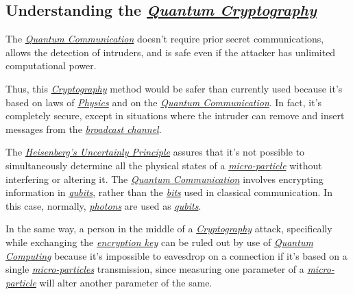 \documentclass[conference]{IEEEtran}
\begin{document}
\vspace{6pt}

\subsection{Understanding the \href{https://en.wikipedia.org/wiki/Quantum_cryptography}{\textit{Quantum Cryptography}}}\label{A4}

The \href{https://en.wikipedia.org/wiki/Quantum_information_science}{\textit{Quantum Communication}} doesn't require prior secret communications, allows the detection of intruders, and is safe even if the attacker has unlimited computational power.

\vspace{4pt}

Thus, this \href{https://en.wikipedia.org/wiki/Cryptography}{\textit{Cryptography}} method would be safer than currently used because it's based on laws of \href{https://en.wikipedia.org/wiki/Physics}{\textit{Physics}} and on the \href{https://en.wikipedia.org/wiki/Quantum_information_science}{\textit{Quantum Communication}}. In fact, it's completely secure, except in situations where the intruder can remove and insert messages from the \href{https://en.wikipedia.org/wiki/Broadcasting}{\textit{broadcast channel}}.

\vspace{4pt}

The \href{https://en.wikipedia.org/wiki/Uncertainty_principle}{\textit{Heisenberg's Uncertainly Principle}} assures that it's not possible to simultaneously determine all the physical states of a \href{https://en.wikipedia.org/wiki/Microparticle}{\textit{micro-particle}} without interfering or altering it. The \href{https://en.wikipedia.org/wiki/Quantum_information_science}{\textit{Quantum Communication}} involves encrypting information in \href{https://en.wikipedia.org/wiki/Qubit}{\textit{qubits}}, rather than the \href{https://en.wikipedia.org/wiki/Bit}{\textit{bits}} used in classical communication. In this case, normally, \href{https://en.wikipedia.org/wiki/Photon}{\textit{photons}} are used as \href{https://en.wikipedia.org/wiki/Qubit}{\textit{qubits}}.

\newpage

In the same way, a person in the middle of a \href{https://en.wikipedia.org/wiki/Cryptography}{\textit{Cryptography}} attack, specifically while exchanging the \href{https://en.wikipedia.org/wiki/Key_(cryptography)}{\textit{encryption key}} can be ruled out by use of \href{https://en.wikipedia.org/wiki/Quantum_computing}{\textit{Quantum Computing}} because it's impossible to eavesdrop on a connection if it's based on a single \href{https://en.wikipedia.org/wiki/Microparticle}{\textit{micro-particles}} transmission, since measuring one parameter of a \href{https://en.wikipedia.org/wiki/Microparticle}{\textit{micro-particle}} will alter another parameter of the same.
\end{document}
